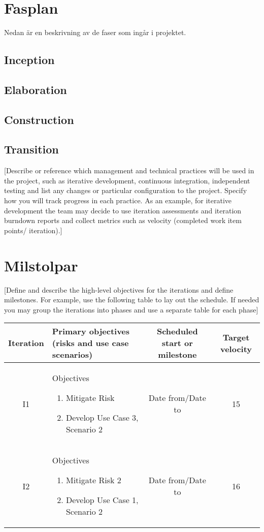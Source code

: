 \section{Fasplan}
Nedan är en beskrivning av de faser som ingår i projektet.
\subsection*{Inception}
\subsection*{Elaboration}
\subsection*{Construction}
\subsection*{Transition}
[Describe or reference which management and technical practices will be used in the project, such as iterative development, continuous integration, independent testing and list any changes or particular configuration to the project. Specify how you will track progress in each practice. As an example, for iterative development the team may decide to use iteration assessments and iteration burndown reports and collect metrics such as velocity (completed work item points/ iteration).]
\section{Milstolpar}
[Define and describe the high-level objectives for the iterations and define milestones. For example, use the following table to lay out the schedule. If needed you may group the iterations into phases and use a separate table for each phase]
\begin{center}
    \begin{tabular}{ | c | m{6cm}  | c | c |}
    \hline
    Iteration & Primary objectives (risks and use case scenarios) & Scheduled start or milestone & Target velocity \\
    \hline
    I1 & Objectives \begin{enumerate} \item Mitigate Risk \item Develop Use Case 3, Scenario 2 \end{enumerate} & Date from/Date to & 15 \\
    \hline
	I2 & Objectives \begin{enumerate} \item Mitigate Risk 2 \item Develop Use Case 1, Scenario 2 \end{enumerate} & Date from/Date to & 16 \\
\hline
    \end{tabular}
\end{center}


